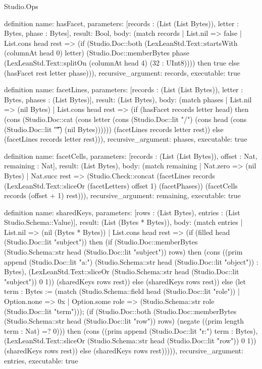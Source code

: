 \begin{lexlean}{Studio.Ops}
\begin{semanticmodule}
{definition{
  name: hasFacet,
  parameters: [records : (List (List Bytes)), letter : Bytes, phase : Bytes],
  result: Bool,
  body: (match records
    | List.nil => false
    | List.cons head rest => (if (Studio.Doc::both (LexLeanStd.Text::startsWith (columnAt head 0) letter) (Studio.Doc::memberBytes phase (LexLeanStd.Text::splitOn (columnAt head 4) (32 : UInt8)))) then true else (hasFacet rest letter phase))),
  recursive_argument: records,
  executable: true
}

definition{
  name: facetLines,
  parameters: [records : (List (List Bytes)), letter : Bytes, phases : (List Bytes)],
  result: (List Bytes),
  body: (match phases
    | List.nil => (nil Bytes)
    | List.cons head rest => (if (hasFacet records letter head) then (cons (Studio.Doc::cat (cons letter (cons (Studio.Doc::lit "/") (cons head (cons (Studio.Doc::lit "\t\n") (nil Bytes)))))) (facetLines records letter rest)) else (facetLines records letter rest))),
  recursive_argument: phases,
  executable: true
}

definition{
  name: facetCells,
  parameters: [records : (List (List Bytes)), offset : Nat, remaining : Nat],
  result: (List Bytes),
  body: (match remaining
    | Nat.zero => (nil Bytes)
    | Nat.succ rest => (Studio.Check::concat (facetLines records (LexLeanStd.Text::sliceOr (facetLetters) offset 1) (facetPhases)) (facetCells records (offset + 1) rest))),
  recursive_argument: remaining,
  executable: true
}

definition{
  name: sharedKeys,
  parameters: [rows : (List Bytes), entries : (List Studio.Schema::Value)],
  result: (List (Bytes * Bytes)),
  body: (match entries
    | List.nil => (nil (Bytes * Bytes))
    | List.cons head rest => (if (filled head (Studio.Doc::lit "subject")) then (if (Studio.Doc::memberBytes (Studio.Schema::str head (Studio.Doc::lit "subject")) rows) then (cons ((prim append (Studio.Doc::lit "a:") (Studio.Schema::str head (Studio.Doc::lit "object")) : Bytes), (LexLeanStd.Text::sliceOr (Studio.Schema::str head (Studio.Doc::lit "subject")) 0 1)) (sharedKeys rows rest)) else (sharedKeys rows rest)) else (let term : Bytes := (match (Studio.Schema::field head (Studio.Doc::lit "role"))
      | Option.none => 0x
      | Option.some role => (Studio.Schema::str role (Studio.Doc::lit "term"))); (if (Studio.Doc::both (Studio.Doc::memberBytes (Studio.Schema::str head (Studio.Doc::lit "row")) rows) (negate ((prim length term : Nat) =? 0))) then (cons ((prim append (Studio.Doc::lit "r:") term : Bytes), (LexLeanStd.Text::sliceOr (Studio.Schema::str head (Studio.Doc::lit "row")) 0 1)) (sharedKeys rows rest)) else (sharedKeys rows rest))))),
  recursive_argument: entries,
  executable: true
}

}
\end{semanticmodule}
\end{lexlean}
